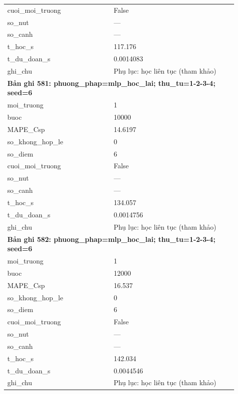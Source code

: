 \begin{longtable}{p{0.43\linewidth}p{0.50\linewidth}}
cuoi\_\allowbreak moi\_\allowbreak truong & False \\
so\_\allowbreak nut & — \\
so\_\allowbreak canh & — \\
t\_\allowbreak hoc\_\allowbreak s & 117.176 \\
t\_\allowbreak du\_\allowbreak doan\_\allowbreak s & 0.0014083 \\
ghi\_\allowbreak chu & Phụ lục: học liên tục (tham khảo) \\
\midrule
\multicolumn{2}{p{0.95\linewidth}}{\textbf{Bản ghi 581: phuong\_phap=mlp\_hoc\_lai; thu\_tu=1-2-3-4; seed=6}} \\
moi\_\allowbreak truong & 1 \\
buoc & 10000 \\
MAPE\_\allowbreak Csp & 14.6197 \\
so\_\allowbreak khong\_\allowbreak hop\_\allowbreak le & 0 \\
so\_\allowbreak diem & 6 \\
cuoi\_\allowbreak moi\_\allowbreak truong & False \\
so\_\allowbreak nut & — \\
so\_\allowbreak canh & — \\
t\_\allowbreak hoc\_\allowbreak s & 134.057 \\
t\_\allowbreak du\_\allowbreak doan\_\allowbreak s & 0.0014756 \\
ghi\_\allowbreak chu & Phụ lục: học liên tục (tham khảo) \\
\midrule
\multicolumn{2}{p{0.95\linewidth}}{\textbf{Bản ghi 582: phuong\_phap=mlp\_hoc\_lai; thu\_tu=1-2-3-4; seed=6}} \\
moi\_\allowbreak truong & 1 \\
buoc & 12000 \\
MAPE\_\allowbreak Csp & 16.537 \\
so\_\allowbreak khong\_\allowbreak hop\_\allowbreak le & 0 \\
so\_\allowbreak diem & 6 \\
cuoi\_\allowbreak moi\_\allowbreak truong & False \\
so\_\allowbreak nut & — \\
so\_\allowbreak canh & — \\
t\_\allowbreak hoc\_\allowbreak s & 142.034 \\
t\_\allowbreak du\_\allowbreak doan\_\allowbreak s & 0.0044546 \\
ghi\_\allowbreak chu & Phụ lục: học liên tục (tham khảo) \\

\end{longtable}
